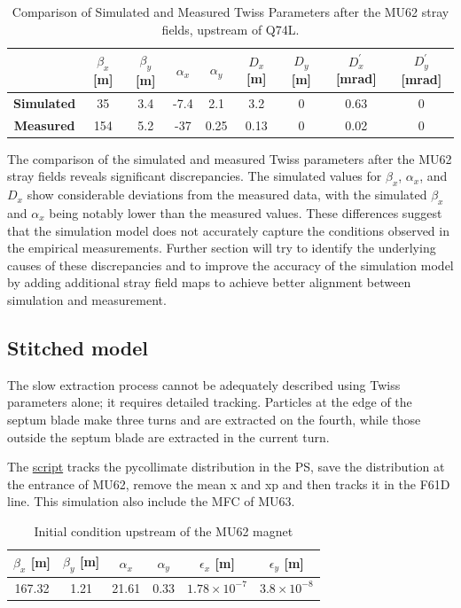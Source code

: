 \begin{table}[htbp]
\centering
\caption{Comparison of Simulated and Measured Twiss Parameters after the MU62 stray fields, upstream of Q74L.}
\label{tab:twiss_comparison}
\begin{tabular}{|c|c|c|c|c|c|c|c|c|}
\hline
& $\beta_{x}$ [m] & $\beta_{y}$ [m] & $\alpha_{x}$ & $\alpha_{y}$ & $D_{x}$ [m] & $D_{y}$ [m] & $D^{'}_{x}$ [mrad] & $D^{'}_{y}$ [mrad] \\
\hline
\textbf{Simulated} & 35 & 3.4 & -7.4 & 2.1 & 3.2 & 0 & 0.63 & 0 \\
\hline
\textbf{Measured} & 154 & 5.2 & -37 & 0.25 & 0.13 & 0 & 0.02 & 0 \\
\hline
\end{tabular}
\end{table}

The comparison of the simulated and measured Twiss parameters after the MU62 stray fields reveals significant discrepancies. The simulated values for $\beta_{x}$, $\alpha_{x}$, and $D_{x}$ show considerable deviations from the measured data, with the simulated $\beta_{x}$ and $\alpha_{x}$ being notably lower than the measured values. These differences suggest that the simulation model does not accurately capture the conditions observed in the empirical measurements. Further section will try to identify the underlying causes of these discrepancies and to improve the accuracy of the simulation model by adding additional stray field maps to achieve better alignment between simulation and measurement.


\subsection{Stitched model}

The slow extraction process cannot be adequately described using Twiss parameters alone; it requires detailed tracking. Particles at the edge of the septum blade make three turns and are extracted on the fourth, while those outside the septum blade are extracted in the current turn.

The \href{https://gitlab.cern.ch/eljohnso/acc-models-tls-eliott-fork/-/blob/EliottBranch/ps_extraction/east-fast-extraction/stitched_slow_extraction_east_PTC_single_turn.ipynb}{script} tracks the pycollimate distribution in the PS, save the distribution at the entrance of MU62, remove the mean x and xp and then tracks it in the F61D line. This simulation also include the MFC of MU63.

\begin{table}[htbp]
\centering
\caption{Initial condition upstream of the MU62 magnet}
\label{tab:twiss_parameters}
\begin{tabular}{|c|c|c|c|c|c|}
\hline
$\beta_{x}$ [m] & $\beta_{y}$ [m] & $\alpha_{x}$ & $\alpha_{y}$ & $\epsilon_x$ [m] & $\epsilon_y$ [m] \\
\hline
167.32 & 1.21 & 21.61 & 0.33 & $1.78 \times 10^{-7}$ & $3.8 \times 10^{-8}$ \\
\hline
\end{tabular}
\end{table}

